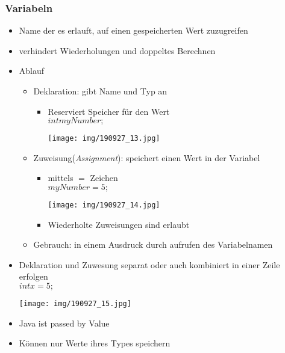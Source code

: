 \documentclass[11pt]{article}
\begin{document}
\subsubsection{Variabeln}
\label{sec:org433a780}
\begin{itemize}
\item Name der es erlauft, auf einen gespeicherten Wert zuzugreifen\\
\item verhindert Wiederholungen und doppeltes Berechnen\\
\item Ablauf\\
\begin{itemize}
\item Deklaration: gibt Name und Typ an\\
\begin{itemize}
\item Reserviert Speicher für den Wert\\
\(int myNumber;\)\\
\begin{center}
\texttt{[image: img/190927\_13.jpg]}
\end{center}
\end{itemize}
\item Zuweisung(\emph{Assignment}): speichert einen Wert in der Variabel\\
\begin{itemize}
\item mittels \(=\) Zeichen\\
\(myNumber = 5;\)\\
\begin{center}
\texttt{[image: img/190927\_14.jpg]}
\end{center}
\item Wiederholte Zuweisungen sind erlaubt\\
\end{itemize}
\item Gebrauch: in einem Ausdruck durch aufrufen des Variabelnamen\\
\end{itemize}

\item Deklaration und Zuwesung separat oder auch kombiniert in einer Zeile erfolgen\\
\(int x = 5;\)\\
\begin{center}
\texttt{[image: img/190927\_15.jpg]}
\end{center}

\item Java ist passed by Value\\
\item Können nur Werte ihres Types speichern\\
\end{itemize}
\end{document}
